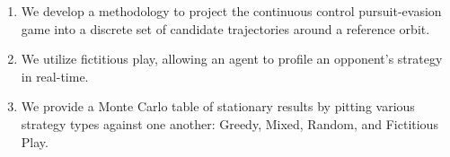 \begin{enumerate}
    \item We develop a methodology to project the continuous control pursuit-evasion game into a discrete set of candidate trajectories around a reference orbit.
    \item We utilize fictitious play, allowing an agent to profile an opponent's strategy in real-time.
    \item We provide a Monte Carlo table of stationary results by pitting various strategy types against one another: Greedy, Mixed, Random, and Fictitious Play.
\end{enumerate}

% 
% 

